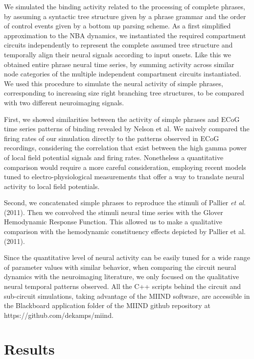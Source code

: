 \documentclass[10pt]{article}
\begin{document}
We simulated the binding activity related to the processing of complete phrases, by assuming a syntactic tree structure given by a phrase grammar and the order of control events given by a bottom up parsing scheme.
As a first simplified approximation to the NBA dynamics, we instantiated the required compartment circuits independently to represent the complete assumed tree structure and temporally align their neural signals according to input onsets.
Like this we obtained entire phrase neural time series, by summing activity across similar node categories of the multiple independent compartment circuits instantiated.
We used this procedure to simulate the neural activity of simple phrases, corresponding to increasing size right branching tree structures, to be compared with two different neuroimaging signals.

First, we showed similarities between the activity of simple phrases and ECoG time series patterns of binding revealed by Nelson et al\cite{Nelson_2017}. 
We naively compared the firing rates of our simulation directly to the patterns observed in ECoG recordings, considering the correlation that exist between the high gamma power of local field potential signals and firing rates\cite{Ray_2011,Manning_2009}.
Nonetheless a quantitative comparison would require a more careful consideration, employing recent models tuned to electro-physiological measurements that offer a way to translate neural activity to local field potentials\cite{Mazzoni_2015,Hagen_2015}.

Second, we concatenated simple phrases to reproduce the stimuli of Pallier \emph{et al.} (2011)\cite{Pallier_2011}.
Then we convolved the stimuli neural time series with the Glover Hemodynamic Response Function\cite{Glover_1999}.
This allowed us to make a qualitative comparison with the hemodynamic constituency effects depicted by Pallier et al. (2011)\cite{Pallier_2011}.

Since the quantitative level of neural activity can be easily tuned for a wide range of parameter values with similar behavior, when comparing the circuit neural dynamics with the neuroimaging literature, we only focused on the qualitative neural temporal patterns observed.
All the C++ scripts behind the circuit and sub-circuit simulations, taking advantage of the MIIND software\cite{de_Kamps_2008}, are accessible in the Blackboard application folder of the MIIND github repository at https://github.com/dekamps/miind.


\section{Results}
\end{document}
